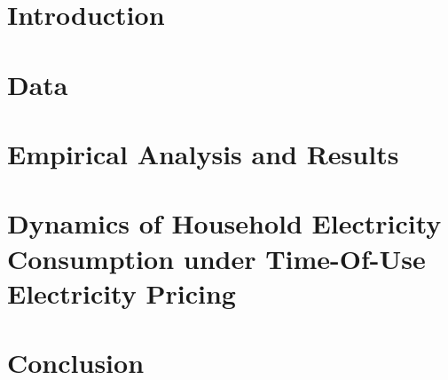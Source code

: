 


\section{Introduction}
\label{Section:Introduction}



\section{Data}
\label{Section:Data}



\section{Empirical Analysis and Results}
\label{Section:Empirical-Analysis-and-Results}



\section{Dynamics of Household Electricity Consumption under Time-Of-Use Electricity Pricing}
\label{Section:Dynamics-of-Household-Electricity-Consumption-under-TOU-Electricity-Pricing}



\section{Conclusion}
\label{Section:Conclusion}



\clearpage



\clearpage
